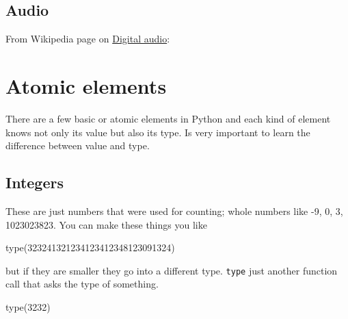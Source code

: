 \begin{fullwidth}
\subsection{Audio}

From Wikipedia page on \href{https://en.wikipedia.org/wiki/Digital_audio}{Digital audio}:


\section{Atomic elements}

There are a few basic or atomic elements in Python and each kind of element knows not only its value but also its type. Is very important to learn the difference between value and type.

\subsection{Integers}

These are just numbers that were used for counting; whole numbers like -9, 0, 3, 1023023823. You can make these things you like
 
\begin{pyconsole}
type(323241321234123412348123091324)
\end{pyconsole}

but if they are smaller they go into a different type. {\tt type} just another function call that asks the type of something.

\begin{pyconsole}
type(3232)
\end{pyconsole}


\end{fullwidth}
